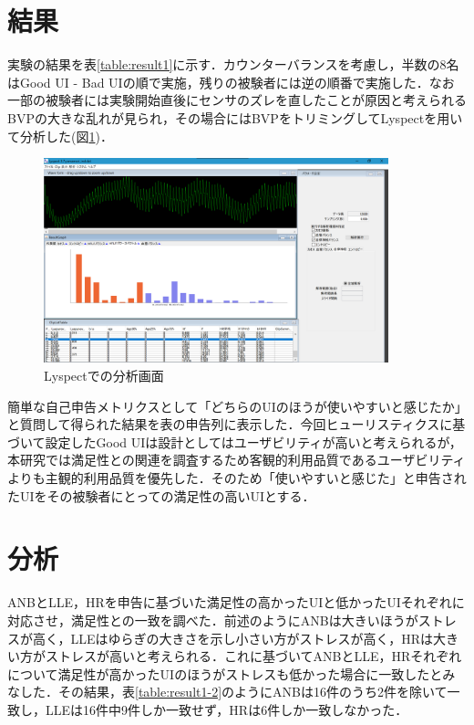 \section{結果}

実験の結果を表\ref{table:result1}に示す．カウンターバランスを考慮し，半数の8名はGood  UI - Bad UIの順で実施，残りの被験者には逆の順番で実施した．なお一部の被験者には実験開始直後にセンサのズレを直したことが原因と考えられるBVPの大きな乱れが見られ，その場合にはBVPをトリミングしてLyspectを用いて分析した(図\ref{fig:lyspect_analyze})．

\begin{figure}[htbp]
  \begin{minipage}{\hsize}
    \begin{center}
       \includegraphics[width=100mm]{img/lyspect_analyze}
    \end{center}
    \caption{Lyspectでの分析画面}
    \label{fig:lyspect_analyze}
  \end{minipage}
\end{figure}

簡単な自己申告メトリクスとして「どちらのUIのほうが使いやすいと感じたか」と質問して得られた結果を表の申告列に表示した．今回ヒューリスティクスに基づいて設定したGood UIは設計としてはユーザビリティが高いと考えられるが，本研究では満足性との関連を調査するため客観的利用品質であるユーザビリティよりも主観的利用品質を優先した．そのため「使いやすいと感じた」と申告されたUIをその被験者にとっての満足性の高いUIとする．

\section{分析}

ANBとLLE，HRを申告に基づいた満足性の高かったUIと低かったUIそれぞれに対応させ，満足性との一致を調べた．前述のようにANBは大きいほうがストレスが高く，LLEはゆらぎの大きさを示し小さい方がストレスが高く，HRは大きい方がストレスが高いと考えられる．これに基づいてANBとLLE，HRそれぞれについて満足性が高かったUIのほうがストレスも低かった場合に一致したとみなした．その結果，表\ref{table:result1-2}のようにANBは16件のうち2件を除いて一致し，LLEは16件中9件しか一致せず，HRは6件しか一致しなかった．

